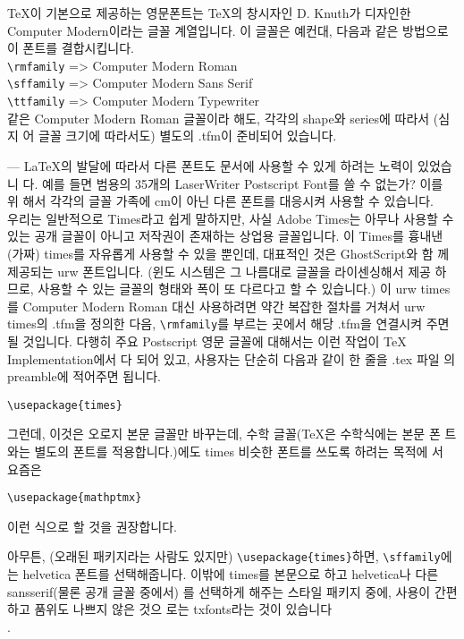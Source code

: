 			TeX이 기본으로 제공하는 영문폰트는 TeX의 창시자인 D. Knuth가 디자인한 Computer 
			Modern이라는 글꼴 계열입니다.
			이 글꼴은 예컨대, 다음과 같은 방법으로 이 폰트를 결합시킵니다.\\
			
			\verb|\rmfamily| => Computer Modern Roman\\
			\verb|\sffamily| => Computer Modern Sans Serif\\
			\verb|\ttfamily| => Computer Modern Typewriter\\
						
			같은 Computer Modern Roman 글꼴이라 해도, 각각의 shape와 series에 따라서 (심지
			어 글꼴 크기에 따라서도) 별도의 .tfm이 준비되어 있습니다.
			
			---
			LaTeX의 발달에 따라서 다른 폰트도 문서에 사용할 수 있게 하려는 노력이 있었습니
			다. 
			예를 들면 범용의 35개의 LaserWriter Postscript Font를 쓸 수 없는가? 이를 위
			해서 각각의 글꼴 가족에 cm이 아닌 다른 폰트를 대응시켜 사용할 수 있습니다.\\
			
			우리는 일반적으로 Times라고 쉽게 말하지만, 사실 Adobe Times는 아무나 사용할 수 
			있는 공개 글꼴이 아니고 저작권이 존재하는 상업용 글꼴입니다. 이 Times를 흉내낸 
			(가짜) times를 자유롭게 사용할 수 있을 뿐인데, 대표적인 것은 GhostScript와 함
			께 제공되는 urw 폰트입니다. (윈도 시스템은 그 나름대로 글꼴을 라이센싱해서 제공
			하므로, 사용할 수 있는 글꼴의 형태와 폭이 또 다르다고 할 수 있습니다.)
			이 urw times를 Computer Modern Roman 대신 사용하려면 약간 복잡한 절차를 거쳐서 
			urw times의 .tfm을 정의한 다음, \verb|\rmfamily|를 부르는 곳에서 해당 .tfm을 연결시켜
			주면 될 것입니다. 다행히 주요 Postscript 영문 글꼴에 대해서는 이런 작업이 TeX 
			Implementation에서 다 되어 있고, 사용자는 단순히 다음과 같이 한 줄을 .tex 파일
			의 preamble에 적어주면 됩니다.
			

			\verb|\usepackage{times}|

			그런데, 이것은 오로지 본문 글꼴만 바꾸는데, 수학 글꼴(TeX은 수학식에는 본문 폰
			트와는 별도의 폰트를 적용합니다.)에도 times 비슷한 폰트를 쓰도록 하려는 목적에
			서 요즘은
			
			\verb|\usepackage{mathptmx}|
			
			이런 식으로 할 것을 권장합니다.
			
			아무튼, (오래된 패키지라는 사람도 있지만) \verb|\usepackage{times}|하면, 
			\verb|\sffamily|에는 helvetica 폰트를 선택해줍니다.
			이밖에 times를 본문으로 하고 helvetica나 다른 sansserif(물론 공개 글꼴 중에서)
			를 선택하게 해주는 스타일 패키지 중에, 사용이 간편하고 품위도 나쁘지 않은 것으
			로는 txfonts라는 것이 있습니다\\. 
			
